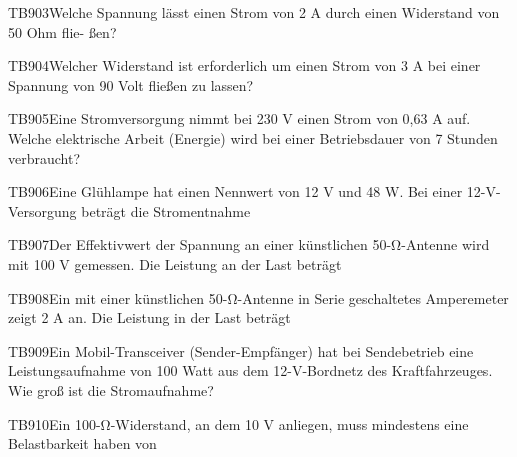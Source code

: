 \begin{question}{TB903}{Welche Spannung lässt einen Strom von 2 A durch einen Widerstand von 50 Ohm flie- ßen?}
\end{question}

\begin{question}{TB904}{Welcher Widerstand ist erforderlich um einen Strom von 3 A bei einer Spannung von 90 Volt fließen zu lassen?}
\end{question}

\begin{question}{TB905}{Eine Stromversorgung nimmt bei 230 V einen Strom von 0,63 A auf. Welche elektrische Arbeit (Energie) wird bei einer Betriebsdauer von 7 Stunden verbraucht?}
\end{question}

\begin{question}{TB906}{Eine Glühlampe hat einen Nennwert von 12 V und 48 W. Bei einer 12-V-Versorgung beträgt die Stromentnahme}
\end{question}

\begin{question}{TB907}{Der Effektivwert der Spannung an einer künstlichen 50-Ω-Antenne wird mit 100 V gemessen. Die Leistung an der Last beträgt}
\end{question}

\begin{question}{TB908}{Ein mit einer künstlichen 50-Ω-Antenne in Serie geschaltetes Amperemeter zeigt 2 A an. Die Leistung in der Last beträgt}
\end{question}

\begin{question}{TB909}{Ein Mobil-Transceiver (Sender-Empfänger) hat bei Sendebetrieb eine Leistungsaufnahme von 100 Watt aus dem 12-V-Bordnetz des Kraftfahrzeuges. Wie groß ist die Stromaufnahme?}
\end{question}

\begin{question}{TB910}{Ein 100-Ω-Widerstand, an dem 10 V anliegen, muss mindestens eine Belastbarkeit haben von}
\end{question}

